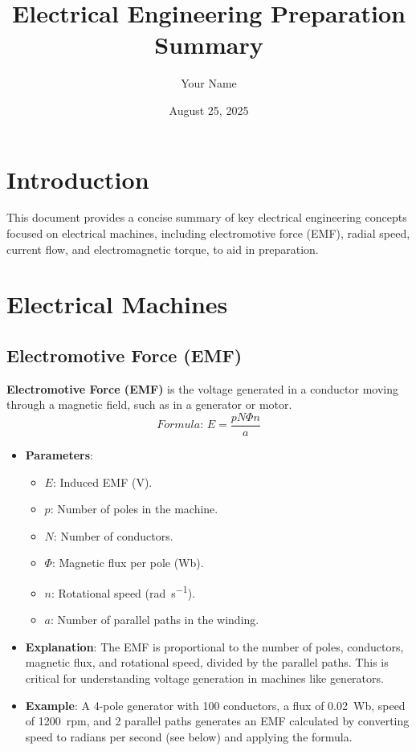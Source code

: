 \documentclass[12pt]{article}
\newcommand{\concept}[1]{\textbf{#1}}
\newcommand{\formula}[1]{\textit{Formula: }#1}
\begin{document}
\title{Electrical Engineering Preparation Summary}
\author{Your Name}
\date{August 25, 2025}
\maketitle

\tableofcontents
\newpage

\section{Introduction}
This document provides a concise summary of key electrical engineering concepts focused on electrical machines, including electromotive force (EMF), radial speed, current flow, and electromagnetic torque, to aid in preparation.

\section{Electrical Machines}
\subsection{Electromotive Force (EMF)}
\concept{Electromotive Force (EMF)} is the voltage generated in a conductor moving through a magnetic field, such as in a generator or motor.
\[
\formula{E = \frac{p N \Phi n}{a}}
\]
\begin{itemize}
    \item \textbf{Parameters}:
        \begin{itemize}
            \item \(E\): Induced EMF (\si{\volt}).
            \item \(p\): Number of poles in the machine.
            \item \(N\): Number of conductors.
            \item \(\Phi\): Magnetic flux per pole (\si{\weber}).
            \item \(n\): Rotational speed (\si{\radian\per\second}).
            \item \(a\): Number of parallel paths in the winding.
        \end{itemize}
    \item \textbf{Explanation}: The EMF is proportional to the number of poles, conductors, magnetic flux, and rotational speed, divided by the parallel paths. This is critical for understanding voltage generation in machines like generators.
    \item \textbf{Example}: A 4-pole generator with 100 conductors, a flux of \SI{0.02}{\weber}, speed of \SI{1200}{rpm}, and 2 parallel paths generates an EMF calculated by converting speed to radians per second (see below) and applying the formula.
\end{itemize}
\end{document}
